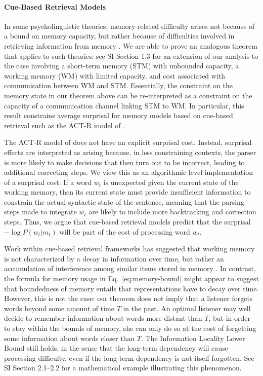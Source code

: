 \paragraph{Cue-Based Retrieval Models}

In some psycholinguistic theories, memory-related difficulty arises not because of a bound on memory capacity, but rather because of difficulties involved in retrieving information from memory \citep{mcelree2000sentence,lewis-activation-based-2005,nicenboim2018models,vasishth2019computational}. We are able to prove an analogous theorem that applies to such theories: see SI Section 1.3 for an extension of our analysis to the case involving a short-term memory (STM) with unbounded capacity, a working memory (WM) with limited capacity, and cost associated with communication between WM and STM. Essentially, the constraint on the memory state in our theorem above can be re-interpreted as a constraint on the capacity of a communication channel linking STM to WM. In particular, this result constrains average surprisal for memory models based on cue-based retrieval such as the ACT-R model of \citet{lewis-activation-based-2005}.

The ACT-R model of \cite{lewis-activation-based-2005} does not have an explicit surprisal cost.
Instead, surprisal effects are interpreted as arising because, in less constraining contexts, the parser is more likely to make decisions that then turn out to be incorrect, leading to additional correcting steps.
We view this as an algorithmic-level implementation of a surprisal cost:
If a word $w_t$ is unexpected given the current state of the working memory, then its current state must provide insufficient information to constrain the actual syntactic state of the sentence, meaning that the parsing steps made to integrate $w_t$ are likely to include more backtracking and correction steps.
Thus, we argue that cue-based retrieval models predict that the surprisal $- \log P(w_t|m_t)$ will be part of the cost of processing word $w_t$.

Work within cue-based retrieval frameworks has suggested that working memory is not characterized by a decay in information over time, but rather an accumulation of interference among similar items stored in memory \citep[][p. 408]{lewis-activation-based-2005}.
In contrast, the formula for memory usage in Eq.~\ref{eq:memory-bound} might appear to suggest that boundedness of memory entails that representations have to decay over time.
However, this is not the case:
our theorem does not imply that a listener forgets words beyond some amount of time $T$ in the past. 
An optimal listener may well decide to remember information about words more distant than $T$, but in order to stay within the bounds of memory, she can only do so at the cost of forgetting some information about words closer than $T$.
The Information Locality Lower Bound still holds, in the sense that the long-term dependency will cause processing difficulty, even if the long-term dependency is not itself forgotten.
See SI Section 2.1--2.2 for a mathematical example illustrating this phenomenon.

